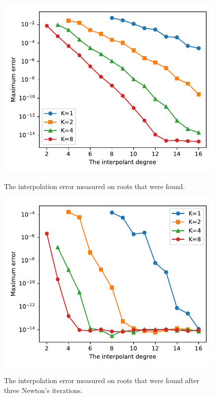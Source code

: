 \begin{figure}
	\centering
	\caption{The interpolation error measured on roots that were found.}
	\includegraphics{tex/figures/interpolant_error}
	\fautor
	\label{fig:interpolant_error}
\end{figure}

\begin{figure}
	\centering
	\caption{The interpolation error measured on roots that were found after three Newton's iterations.}
	\includegraphics{tex/figures/interpolant_error_after_newton}
	\fautor
	\label{fig:interpolant_error_after_newton}
\end{figure}

